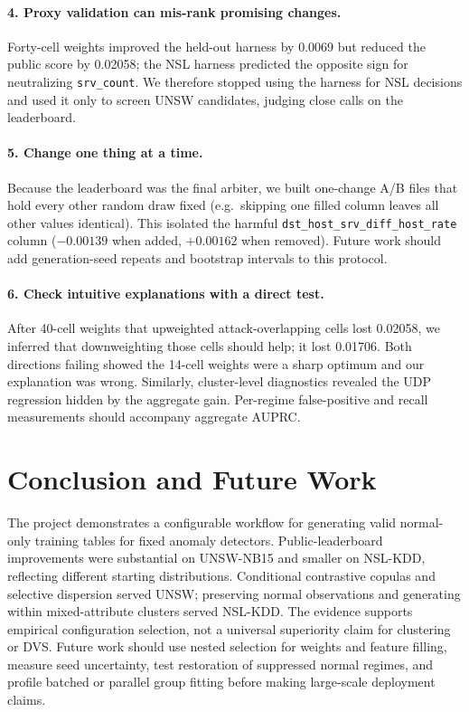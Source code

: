 \documentclass[10pt,a4paper]{article}
\begin{document}
\paragraph{4. Proxy validation can mis-rank promising changes.}
Forty-cell weights improved the held-out harness by 0.0069 but reduced the public score by 0.02058; the NSL harness predicted the opposite sign for neutralizing \texttt{srv\_\allowbreak count}. We therefore stopped using the harness for NSL decisions and used it only to screen UNSW candidates, judging close calls on the leaderboard.

\paragraph{5. Change one thing at a time.}
Because the leaderboard was the final arbiter, we built one-change A/B files that hold every other random draw fixed (e.g.\ skipping one filled column leaves all other values identical). This isolated the harmful \texttt{dst\_\allowbreak host\_\allowbreak srv\_\allowbreak diff\_\allowbreak host\_\allowbreak rate} column ($-0.00139$ when added, $+0.00162$ when removed). Future work should add generation-seed repeats and bootstrap intervals to this protocol.

\paragraph{6. Check intuitive explanations with a direct test.}
After 40-cell weights that upweighted attack-overlapping cells lost 0.02058, we inferred that downweighting those cells should help; it lost 0.01706. Both directions failing showed the 14-cell weights were a sharp optimum and our explanation was wrong. Similarly, cluster-level diagnostics revealed the UDP regression hidden by the aggregate gain. Per-regime false-positive and recall measurements should accompany aggregate AUPRC.

\section{Conclusion and Future Work}
The project demonstrates a configurable workflow for generating valid normal-only training tables for fixed anomaly detectors. Public-leaderboard improvements were substantial on UNSW-NB15 and smaller on NSL-KDD, reflecting different starting distributions. Conditional contrastive copulas and selective dispersion served UNSW; preserving normal observations and generating within mixed-attribute clusters served NSL-KDD. The evidence supports empirical configuration selection, not a universal superiority claim for clustering or DVS. Future work should use nested selection for weights and feature filling, measure seed uncertainty, test restoration of suppressed normal regimes, and profile batched or parallel group fitting before making large-scale deployment claims.
\end{document}
